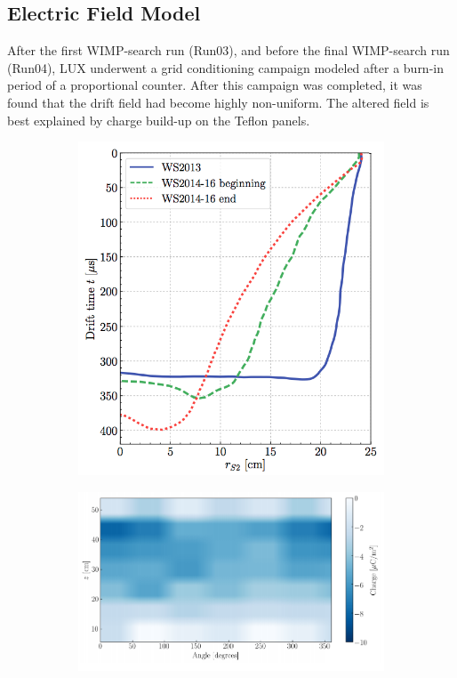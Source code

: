 \subsection{Electric Field Model}\label{sec:efield}
After the first WIMP-search run (Run03), and before the final WIMP-search run (Run04), LUX underwent a grid conditioning campaign modeled after a burn-in period of a proportional counter. After this campaign was completed, it was found that the drift field had become highly non-uniform. The altered field is best explained by charge build-up on the Teflon panels.
\begin{figure}[!h]
\centering
\begin{subfigure}{0.5\linewidth}
\centering
\includegraphics[width=\linewidth]{Figures/wall_radius.png}
\caption{}
\end{subfigure}%
\begin{subfigure}{0.5\linewidth}
\centering
\includegraphics[width=\linewidth]{Figures/wall_charge.png}

\end{subfigure}
\end{figure}
